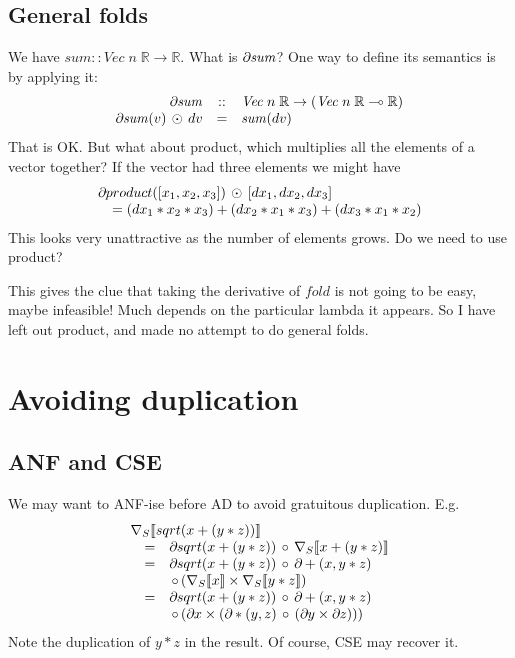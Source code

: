 \documentclass[sigplan,review]{acmart}
\newcommand{\deriv}{\partial}  %
\renewcommand{\to}{\rightarrow}    %
\newcommand{\linto}{\multimap}     %
\newcommand{\grad}[1]{\nabla_S\lb #1 \rb}  %
\newcommand{\gradf}[1]{\deriv\hspace{-0.15mm} #1}  %
\newcommand{\lb}{\llbracket}
\newcommand{\rb}{\rrbracket}
\newcommand{\sumfunname}{\mathit{sum}}   %
\newcommand{\sumfun}[1]{\sumfunname(#1)}   %
\renewcommand{\vector}[2]{\mathit{Vec}\;#1\;#2}   %
\newcommand{\real}{\mathbb{R}}       %
\newcommand{\lmcomp}{\,\circ\,}   %
\newcommand{\lmvcat}{\times}         %
\newcommand{\lmapply}{\,\odot\,}      %
\begin{document}
\subsection{General folds} \label{sec:gen-fold}

We have $\sumfunname :: \vector{n}{\real} \to \real$.  What is $\gradf{\sumfunname}$?
One way to define its semantics is by applying it:
$$
\begin{array}{rcl}
  \gradf{\sumfunname} & :: & \vector{n}{\real} \to (\vector{n}{\real} \linto \real) \\
  \gradf{\sumfunname}(v) \lmapply dv & = & \sumfun{dv}
\end{array}
$$
That is OK.  But what about product, which multiplies all the elements
of a vector together? If the vector had three elements we might have
$$
\begin{array}{l}
  \gradf{product}([x_1,x_2,x_3]) \lmapply [dx_1, dx_2, dx_3] \\
  \quad = (dx_1 * x_2 * x_3) + (dx_2 * x_1 * x_3) + (dx_3 * x_1 * x_2)
\end{array}
$$
This looks very unattractive as the number of elements grows.  Do we need
to use product?

This gives the clue that taking the derivative of $\mathit{fold}$ is
not going to be easy, maybe infeasible!  Much depends on the
particular lambda it appears.  So I have left out product, and made
no attempt to do general folds.


\section{Avoiding duplication}

\subsection{ANF and CSE}

We may want to ANF-ise before AD to avoid gratuitous duplication.
  E.g.
$$
  \begin{array}{rcl}
    \multicolumn{3}{l}{\grad{sqrt(x+(y*z))}} \\
      & = & \gradf{sqrt}(x+(y*z)) \lmcomp \grad{x+(y*z)} \\
    & = & \gradf{sqrt}(x+(y*z)) \lmcomp  \gradf{+}(x, y*z) \\
     && \lmcomp (\grad{x} \lmvcat \grad{y*z}) \\
    & = & \gradf{sqrt}(x+(y*z)) \lmcomp \gradf{+}(x, y*z) \\
    & & \lmcomp (\gradf{x} \lmvcat (\gradf{*}(y,z) \lmcomp (\gradf{y} \lmvcat \gradf{z}))) \\
  \end{array}
  $$
Note the duplication of $y*z$ in the result.
Of course, CSE may recover it.
\end{document}
